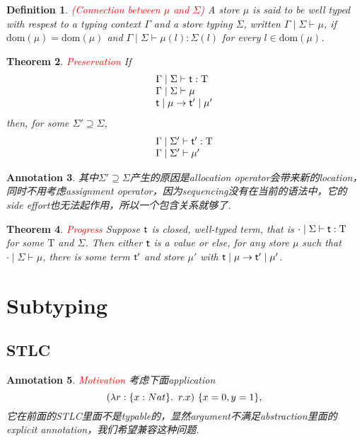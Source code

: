 \documentclass{article}
\theoremstyle{plain}
\newtheorem{theorem}{Theorem}
\newtheorem{definition}[theorem]{Definition}
\newtheorem{annotation}[theorem]{Annotation}
\theoremstyle{nonumberplain}
\newcommand{\lam}[2]{\ensuremath{\lambda #1\ldotp~ #2}} %
\newcommand{\singletype}[1]{\text{#1}}
\newcommand{\termtype}[2]{\ensuremath{#1:#2}}
\newcommand{\term}[1]{\ensuremath\mathsf{#1}}
\newcommand{\redt}[1]{\textcolor{red}{#1}}
\begin{document}
\begin{definition}
\rm \redt{(Connection between $\mu$ and $\Sigma$)} A store $\mu$ is said to be well typed with respest to a typing context $\Gamma$ and a store typing $\Sigma$, written $\Gamma \mid \Sigma \vdash \mu$, if $\text{dom}(\mu) = \text{dom}(\mu)$ and $\Gamma \mid \Sigma \vdash \termtype{\mu({l})}{\Sigma(l)}$ for every $l \in \text{dom}(\mu)$. 
\end{definition}

\begin{theorem}
\rm \redt{Preservation} If 
$$
\begin{array}{lll}
\Gamma \mid \Sigma \vdash \termtype{\term{t}}{\singletype{T}} \\
\Gamma \mid \Sigma \vdash \mu  \\
\term{t} \mid \mu \to \term{t}' \mid \mu' 
\end{array}
$$
then, for some $\Sigma' \supseteq \Sigma$,
$$
\begin{array}{ll}
\Gamma \mid \Sigma' \vdash \termtype{\term{t}'}{\singletype{T}} \\
\Gamma \mid \Sigma' \vdash \mu'
\end{array}
$$
\end{theorem}

\begin{annotation}
\rm 其中$\Sigma' \supseteq \Sigma$产生的原因是allocation operator会带来新的location，同时不用考虑assignment operator，因为sequencing没有在当前的语法中，它的side effort也无法起作用，所以一个包含关系就够了. 
\end{annotation}


\begin{theorem}
\rm \redt{Progress} Suppose $\term{t}$ is closed, well-typed term, that is $\cdot \mid \Sigma \vdash \termtype{\term{t}}{\singletype{T}}$ for some $\singletype{T}$ and $\Sigma$. Then either $\term{t}$ is a value or else, for any store $\mu$ such that $\cdot \mid \Sigma \vdash \mu$, there is some term $\term{t}'$ and store $\mu'$ with $\term{t} \mid \mu \to \term{t}' \mid \mu'$.
\end{theorem}


\newpage
\section{Subtyping}

\subsection{STLC}
\begin{annotation}
\rm \redt{Motivation} 考虑下面application
$$
(\lam{\termtype{r}{\{x:Nat\}}}{r.x})~\{x=0,y=1\},
$$
它在前面的STLC里面不是typable的，显然argument不满足abstraction里面的explicit annotation，我们希望兼容这种问题. 
\end{annotation}
\end{document}
